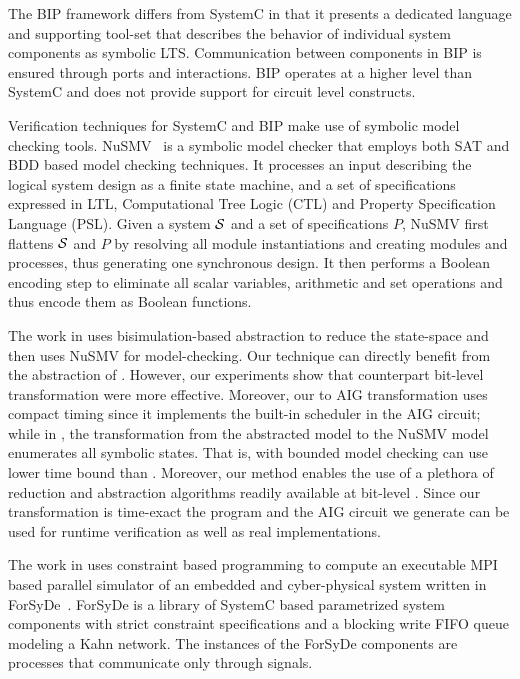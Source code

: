 The BIP framework differs from SystemC in that it presents a dedicated language and supporting
tool-set that describes the behavior of individual system components as symbolic LTS. 
Communication between components in BIP is ensured through ports and interactions.   
BIP operates at a higher level than SystemC and does not provide support for circuit level 
constructs.

Verification techniques for SystemC and BIP make use of symbolic model checking tools. 
NuSMV~\cite{nusmv} is a symbolic model checker that employs both 
SAT and BDD based model checking techniques. It processes an input 
describing the logical system design as a finite state machine, and a set of specifications
expressed in LTL, Computational Tree Logic (CTL) and Property Specification Language (PSL).
Given a system $\mathcal{S}$ and a set of specifications $P$, NuSMV first flattens $\mathcal{S}$ and $P$ by 
resolving all module instantiations and creating modules and processes, thus generating one 
synchronous design. It then performs a Boolean encoding step to eliminate all scalar variables, 
arithmetic and set operations and thus encode them as Boolean functions.

The work in \cite{facs14} uses bisimulation-based abstraction to reduce the state-space and then uses NuSMV for model-checking. Our technique can directly benefit from the abstraction of \cite{facs14}. However, our experiments show that counterpart bit-level transformation were more effective. Moreover, our \caig to AIG transformation uses compact timing since it implements the built-in scheduler in the AIG circuit; while in \cite{facs14}, the transformation from the abstracted model to the NuSMV model enumerates all symbolic states. That is, with \biptool bounded model checking can use lower time bound than \cite{facs14}. Moreover, our method enables the use of a plethora of reduction and abstraction algorithms readily available at bit-level \cite{brayton2010abc}. 
Since our transformation is time-exact the \caig program and the AIG circuit we generate can be used for runtime verification as well as real implementations. 
   

The work in \cite{NiakiDATAS13} uses constraint based
programming to compute an executable 
MPI based parallel simulator of an embedded and cyber-physical 
system written in ForSyDe~\cite{SanderJ04}.
ForSyDe is a library of SystemC based 
parametrized system components with strict constraint 
specifications and a blocking write FIFO queue modeling 
a Kahn network. 
The instances of the ForSyDe components are processes that 
communicate only through signals. 

